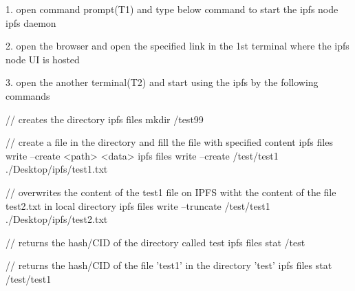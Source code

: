 1. open command prompt(T1) and type below command to start the ipfs node
ipfs daemon

2. open the browser and open the specified link in the 1st terminal where the ipfs node UI is hosted

3. open the another terminal(T2) and start using the ipfs by the following commands


// creates the directory
ipfs files mkdir /test99

// create a file in the directory and fill the file with specified content
ipfs files write --create  <path> <data>   
ipfs files write --create /test/test1 ./Desktop/ipfs/test1.txt

// overwrites the content of the test1 file on IPFS witht the content of the file test2.txt in local directory
ipfs files write --truncate /test/test1 ./Desktop/ipfs/test2.txt

// returns the hash/CID of the directory called test
ipfs files stat /test

// returns the hash/CID of the file 'test1' in the directory 'test'
ipfs files stat /test/test1